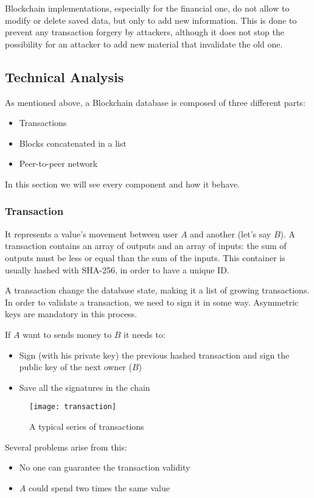 Blockchain implementations, especially for the financial one, do not allow to
modify or delete saved data, but only to add new information. This is done to
prevent any transaction forgery by attackers, although it does not stop the
possibility for an attacker to add new material that invalidate the old one.

\subsection{Technical Analysis}

As mentioned above, a Blockchain database is composed of three different
parts\cite{sok15}:
\begin{itemize}
 \item Transactions
 \item Blocks concatenated in a list
 \item Peer-to-peer network
\end{itemize}

In this section we will see every component and how it behave.

\subsubsection{Transaction}
It represents a value's movement between user $A$ and another (let's
say $B$). A transaction contains an array of outputs and an array of
inputs\cite{sok15}: the sum of outputs must be less or equal than the sum of
the inputs.
This container is usually hashed with SHA-256, in order to have a
unique ID.

A transaction change the database state, making it a list of growing
transactions.
In order to validate a transaction, we need to sign it in some way. Asymmetric
keys are mandatory in this process.

If $A$ want to sends money to $B$ it needs to:
\begin{itemize}
 \item Sign (with his private key) the previous hashed transaction and sign the
public key of the next owner ($B$)
 \item Save all the signatures in the chain
\end{itemize}

\begin{figure}[h]
 \centering
 \texttt{[image: transaction]}
 \caption{A typical series of transactions}
\end{figure}

Several problems arise from this:
\begin{itemize}
 \item No one can guarantee the transaction validity
 \item $A$ could spend two times the same value
\end{itemize}

